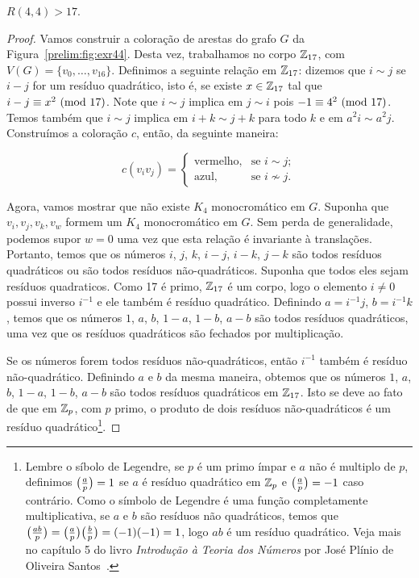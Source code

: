\begin{proposition}
\label{prelim:thm:exr44}
$R(4,4) > 17$.
\end{proposition}
\begin{proof}
Vamos construir a coloração de arestas do grafo $G$ da Figura~\ref{prelim:fig:exr44}. Desta vez, trabalhamos no corpo $\mathbb{Z}_{17}$, com $V(G) = \{v_0,\dots,v_{16}\}$. Definimos a seguinte relação em $\mathbb{Z}_{17}$: dizemos que $i \sim j$ se $ i - j $ for um resíduo quadrático, isto é, se existe $x \in \mathbb{Z}_{17}$ tal que $i - j \equiv x^2 \ (\text{mod}\ 17)$.
Note que $i \sim j$ implica em $ j \sim i$ pois $-1 \equiv 4^2 \ (\text{mod}\ 17)$. Temos também que $i \sim j$ implica em $i + k \sim j + k$ para todo $k$ e em $a^2 i \sim a^2 j$. Construímos a coloração $c$, então, da seguinte maneira:

\[c(v_i v_j) = \begin{cases}
  \text{vermelho}, & \text{se } i \sim j; \\
  \text{azul}, & \text{se } i \not\sim j.
\end{cases}\]

Agora, vamos mostrar que não existe $K_4$ monocromático em $G$. Suponha que $v_i, v_j, v_k, v_w$ formem um $K_4$ monocromático em $G$. Sem perda de generalidade, podemos supor $w = 0$ uma vez que esta relação é invariante à translações. Portanto, temos que os números $i$, $j$, $k$, $i - j$, $i - k$, $j - k$ são todos resíduos quadráticos ou são todos resíduos não-quadráticos. Suponha que todos eles sejam resíduos quadraticos. Como 17 é primo, $\mathbb{Z}_{17}$ é um corpo, logo o elemento $i \neq 0$ possui inverso $i^{-1}$ e ele também é resíduo quadrático.
Definindo $a = i^{-1}j$, $b = i^{-1}k$, temos que os números $1$, $a$, $b$, $1 - a$, $1- b$, $a - b$ são todos resíduos quadráticos, uma vez que os resíduos quadráticos são fechados por multiplicação.

Se os números forem todos resíduos não-quadráticos, então $i^{-1}$ também é resíduo não-quadrático. Definindo $a$ e $b$ da mesma maneira, obtemos que os números $1$, $a$, $b$, $1 - a$, $1- b$, $a - b$ são todos resíduos quadráticos em $\mathbb{Z}_{17}$.
Isto se deve ao fato de que em $\mathbb{Z}_{p}$, com $p$ primo, o produto de dois resíduos não-quadráticos é um resíduo quadrático\footnote{Lembre o síbolo de Legendre, se $p$ é um primo ímpar e $a$ não é multiplo de $p$, definimos $\big(\frac{a}{p}\big) = 1$ se $a$ é resíduo quadrático em $\mathbb{Z}_{p}$ e $\big(\frac{a}{p}\big) = -1$ caso contrário.
Como o símbolo de Legendre é uma função completamente multiplicativa, se $a$ e $b$ são resíduos não quadráticos, temos que $\big(\frac{ab}{p}\big) = \big(\frac{a}{p}\big) \big(\frac{b}{p}\big) = (-1)(-1) = 1$, logo $ab$ é um resíduo quadrático. Veja mais no capítulo 5 do livro \emph{Introdução à Teoria dos Números} por José Plínio de Oliveira Santos~\cite{plinio}.}.


\end{proof}
